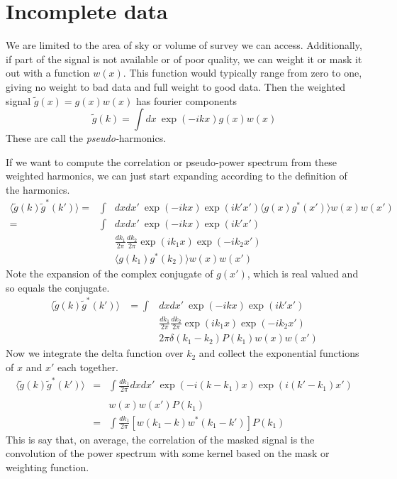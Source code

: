 \section{Incomplete data}

We are limited to the area of sky or volume of survey we can access.  Additionally, if part of the signal is not available or of poor quality, we can weight it or mask it out with a function $w(x)$.  This function would typically range from zero to one, giving no weight to bad data and full weight to good data.  Then the weighted signal $\tilde g(x) = g(x) w(x)$ has fourier components
\begin{equation}
  \tilde g(k) = \int dx\  \exp(-i k x) g(x) w(x)
\end{equation}
These are call the \textit{pseudo-}harmonics.

If we want to compute the correlation or pseudo-power spectrum from these weighted harmonics, we can just start expanding according to the definition of the harmonics.
\begin{eqnarray}
  \langle \tilde g(k) \tilde g^*(k') \rangle = &\int& dx dx' \ \exp(-i k x)\exp(i k' x') \langle g(x) g^*(x') \rangle w(x) w(x')  \nonumber \\
  = &\int &dx dx' \ \exp(-i k x)\exp(i k' x')  \nonumber \\
  & & \frac{dk_1}{2\pi} \frac{dk_2}{2\pi} \exp(i k_1 x)\exp(-i k_2 x')  \nonumber \\
  & & \langle g(k_1) g^*(k_2) \rangle w(x) w(x')  
\end{eqnarray}
Note the expansion of the complex conjugate of $g(x')$, which is real valued and so equals the conjugate.
 \begin{eqnarray}
   \langle \tilde g(k) \tilde g^*(k') \rangle  &= \int &dx dx' \ \exp(-i k x)\exp(i k' x')  \nonumber \\
  & &\frac{dk_1}{2\pi} \frac{dk_2}{2\pi} \exp(i k_1 x)\exp(-i k_2 x')  \nonumber \\
  & & 2\pi \delta(k_1 - k_2) P(k_1) w(x) w(x') 
\end{eqnarray}
Now we integrate the delta function over $k_2$ and collect the exponential functions of $x$ and $x'$ each together.
 \begin{eqnarray}
   \langle \tilde g(k) \tilde g^*(k') \rangle  &= & \int\frac{dk_1}{2\pi} dx dx' \ \exp(-i (k - k_1) x)\exp(i (k'-k_1) x')  \nonumber \\
  & &  \nonumber \\
   & &  w(x) w(x') P(k_1) \nonumber \\
   &=&  \int\frac{dk_1}{2\pi} \left[  w(k_1-k) w^*(k_1-k') \right] P(k_1) %
\end{eqnarray}
This is say that, on average, the correlation of the masked signal is the convolution of the power spectrum with some kernel based on the mask or weighting function.

